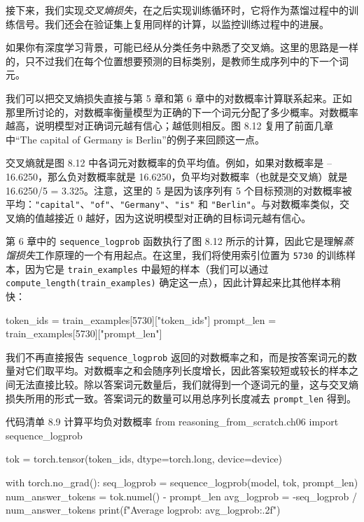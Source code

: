 接下来，我们实现\emph{交叉熵损失}，在之后实现训练循环时，它将作为蒸馏过程中的训练信号。我们还会在验证集上复用同样的计算，以监控训练过程中的进展。

如果你有深度学习背景，可能已经从分类任务中熟悉了交叉熵。这里的思路是一样的，只不过我们在每个位置想要预测的目标类别，是教师生成序列中的下一个词元。

我们可以把交叉熵损失直接与第 5 章和第 6 章中的对数概率计算联系起来。正如那里所讨论的，对数概率衡量模型为正确的下一个词元分配了多少概率。对数概率越高，说明模型对正确词元越有信心；越低则相反。图 8.12 复用了前面几章中“The capital of Germany is Berlin”的例子来回顾这一点。


交叉熵就是图 8.12 中各词元对数概率的负平均值。例如，如果对数概率是 –16.6250，那么负对数概率就是 16.6250，负平均对数概率（也就是交叉熵）就是 16.6250/5 = 3.325。注意，这里的 5 是因为该序列有 5 个目标预测的对数概率被平均：\texttt{"}\texttt{capital}\texttt{"}、\texttt{"}\texttt{of}\texttt{"}、\texttt{"}\texttt{Germany}\texttt{"}、\texttt{"}\texttt{is}\texttt{"} 和 \texttt{"}\texttt{Berlin}\texttt{"}。与对数概率类似，交叉熵的值越接近 0 越好，因为这说明模型对正确的目标词元越有信心。

第 6 章中的 \texttt{sequence\_logprob} 函数执行了图 8.12 所示的计算，因此它是理解\emph{蒸馏损失}工作原理的一个有用起点。在这里，我们将使用索引位置为 \texttt{5730} 的训练样本，因为它是 \texttt{train\_examples} 中最短的样本（我们可以通过 \texttt{compute\_length(train\_examples)} 确定这一点），因此计算起来比其他样本稍快：

\begin{codebox}
token_ids = train_examples[5730]["token_ids"]
prompt_len = train_examples[5730]["prompt_len"]
\end{codebox}

我们不再直接报告 \texttt{sequence\_logprob} 返回的对数概率之和，而是按答案词元的数量对它们取平均。对数概率之和会随序列长度增长，因此答案较短或较长的样本之间无法直接比较。除以答案词元数量后，我们就得到一个逐词元的量，这与交叉熵损失所用的形式一致。答案词元的数量可以用总序列长度减去 \texttt{prompt\_len} 得到。

\begin{codeboxt}{代码清单 8.9 计算平均负对数概率}
from reasoning_from_scratch.ch06 import sequence_logprob

tok = torch.tensor(token_ids, dtype=torch.long, device=device)

with torch.no_grad():
    seq_logprob = sequence_logprob(model, tok, prompt_len)
    num_answer_tokens = tok.numel() - prompt_len
    avg_logprob = -seq_logprob / num_answer_tokens
print(f"Average logprob: {avg_logprob:.2f}")
\end{codeboxt}

